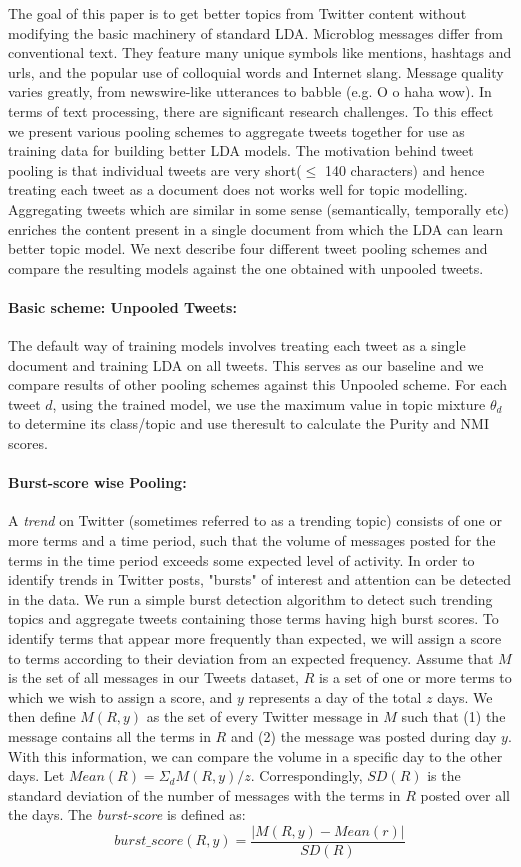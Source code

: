 \documentclass[10pt,a5paper,twoside]{article}
\begin{document}
The goal of this paper is to get better topics from Twitter content without modifying the basic machinery of standard LDA. Microblog messages differ from conventional text. They feature many unique symbols like mentions, hashtags and urls, and the popular use of colloquial words and Internet slang. Message quality varies greatly, from newswire-like utterances  to babble (e.g. O o haha wow). In terms of text processing, there are significant research challenges. To this effect we present various pooling schemes to aggregate tweets together for use as training data for building better LDA models. The motivation behind tweet pooling is that individual tweets are very short($\leq$ 140 characters) and hence treating each tweet as a document does not works well for topic modelling. Aggregating tweets which are similar in some sense (semantically, temporally etc) enriches the content present in a single document from which the LDA can learn better topic model. We next describe four different tweet pooling schemes and compare the resulting models against the one obtained with unpooled tweets.

\paragraph{Basic scheme: Unpooled Tweets:}
The default way of training models involves treating each tweet as a single document and training LDA on all tweets. This serves as our baseline and we compare results of other pooling schemes against this Unpooled scheme. For each tweet $d$, using the trained model, we use the maximum value in topic mixture $\theta_{d} $ to determine its class/topic and use theresult to calculate the Purity and NMI scores.

\paragraph{Burst-score wise Pooling:}
A \textit{trend} on Twitter (sometimes referred to as a trending topic) consists of one or more terms and a time period, such that the volume of messages posted for the terms in the time period exceeds some expected level of activity. In order to identify trends in Twitter posts, "bursts" of interest and attention can be detected in the data. We run a simple burst detection algorithm to detect such trending topics and aggregate tweets containing those terms having high burst scores.
To identify terms that appear more frequently than expected, we will assign a score to terms according to their deviation from an expected frequency. Assume that $M$ is the set of all messages in our Tweets dataset, $R$ is a set of one or more terms to which we wish to assign a score, and $y$ represents a day of the total $z$ days. We then define $M(R, y)$ as the set of every Twitter message in $M$ such that (1) the message contains all the terms in $R$ and (2) the message was posted during day $y$. With this information, we can compare the volume in a specific day to the other days. Let 
$ Mean(R) = \Sigma_d M(R,y) / z $.
Correspondingly, $ SD(R) $ is the standard deviation of the number of messages with the terms in $R$ posted over all the days. The \textit{burst-score} is defined as:
\[
burst\_score(R,y) = \frac{|M(R,y) - Mean(r)|}{SD(R)} 
\]
\end{document}
